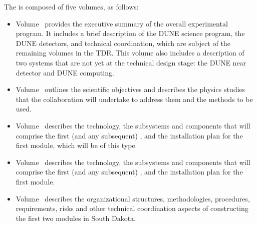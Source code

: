 The   is composed of five volumes, as follows:

\begin{itemize}
\item Volume~\volnumberexec{} provides the executive summary of the overall experimental program. It includes a brief description of the DUNE science program, the DUNE detectors, and technical coordination, which are subject of the remaining volumes in the TDR. This volume also includes a description of two systems that are not yet at the technical design stage: the DUNE near detector and DUNE computing.
\item Volume~\volnumberphysics{} outlines the scientific objectives and describes the physics studies that the  collaboration will undertake to address them and the methods to be used.
\item Volume~\volnumbersp{} describes the   technology, the subsystems and components that will comprise the first (and any subsequent)  , and the installation plan for the first  module, which will be of this type. 
\item Volume~\volnumberdp{} describes the   technology, the subsystems and components that will comprise the first (and any subsequent)  , and the installation plan for the first  module. 
\item Volume~\volnumbertc{} describes the organizational structures,  methodologies, procedures, requirements, risks and other technical  coordination aspects of constructing the first two  modules in South Dakota.
\end{itemize}

